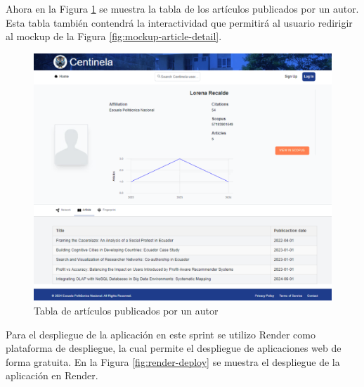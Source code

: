 Ahora en la Figura \ref{fig:articles-table} se muestra la tabla de los artículos publicados por un autor. Esta tabla también contendrá la interactividad que permitirá al usuario redirigir al mockup de la Figura \ref{fig:mockup-article-detail}.
\begin{figure}[H]
    \centering
    \includegraphics[scale=0.5]{../02Figures/02Chapter/Sprints/Sprint-2/article-table.png}
    \caption{Tabla de artículos publicados por un autor}
    \label{fig:articles-table}
\end{figure}

Para el despliegue de la aplicación en este sprint se utilizo Render como plataforma de despliegue, la cual permite el despliegue de aplicaciones web de forma gratuita.
En la Figura \ref{fig:render-deploy} se muestra el despliegue de la aplicación en Render.

%

